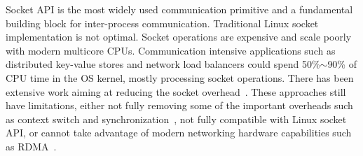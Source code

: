 Socket API is the most widely used communication primitive and a fundamental building block for inter-process communication. Traditional Linux socket implementation is not optimal. Socket operations are expensive and scale poorly with modern multicore CPUs. Communication intensive applications such as distributed key-value stores and network load balancers could spend 50\%$\sim$90\% of CPU time in the OS kernel, mostly processing socket operations. There has been extensive work aiming at reducing the socket overhead~\cite{peter2016arrakis,yasukata2016stackmap,jeong2014mtcp}. These approaches still have limitations, either not fully removing some of the important overheads such as context switch and synchronization~\cite{lin2016scalable,han2012megapipe,jeong2014mtcp,baumann2009multikernel}, not fully compatible with Linux socket API, or cannot take advantage of modern networking hardware capabilities such as RDMA~\cite{dunkels2001design,jeong2014mtcp,libvma,openonload}.


